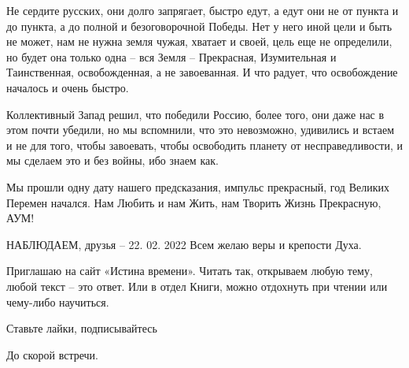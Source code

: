 \begin{zznagolos}
Не сердите русских, они долго запрягает, быстро едут, а едут они не от пункта и
до пункта, а до полной и безоговорочной Победы. Нет у него иной цели и быть не
может, нам не нужна земля чужая, хватает и своей, цель еще не определили, но
будет она только одна – вся Земля – Прекрасная, Изумительная и Таинственная,
освобожденная, а не завоеванная. И что радует, что освобождение началось и
очень быстро.	
\end{zznagolos}

Коллективный Запад решил, что победили Россию, более того, они даже нас в этом
почти убедили, но мы вспомнили, что это невозможно, удивились и встаем и не для
того, чтобы завоевать, чтобы освободить планету от несправедливости, и мы
сделаем это и без войны, ибо знаем как.

Мы прошли одну дату нашего предсказания, импульс прекрасный, год Великих
Перемен начался. Нам Любить и нам Жить, нам Творить Жизнь Прекрасную, АУМ!

НАБЛЮДАЕМ, друзья – 22. 02. 2022 Всем желаю веры и крепости Духа.

Приглашаю на сайт «Истина времени». Читать так, открываем любую тему, любой
текст – это ответ. Или в отдел Книги, можно отдохнуть при чтении или чему-либо
научиться.

Ставьте лайки, подписывайтесь

До скорой встречи.
